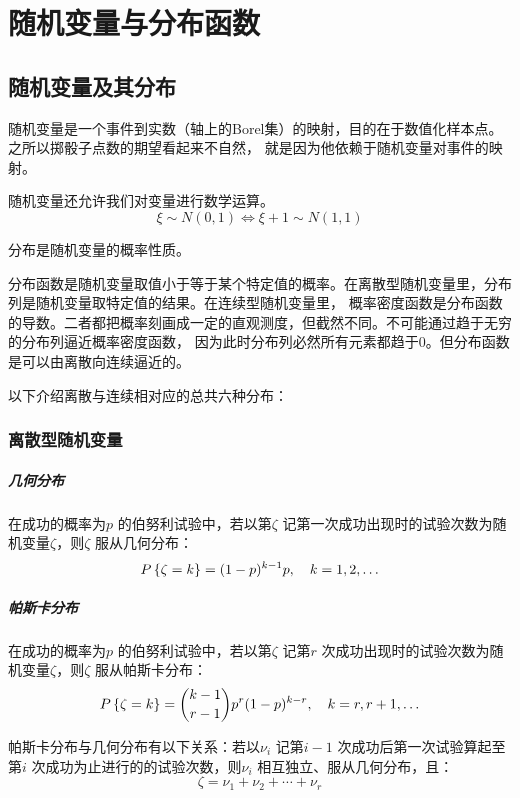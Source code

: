 \chapter{随机变量与分布函数}
\section{随机变量及其分布}
随机变量是一个事件到实数（轴上的Borel集）的映射，目的在于数值化样本点。之所以掷骰子点数的期望看起来不自然，
就是因为他依赖于随机变量对事件的映射。

随机变量还允许我们对变量进行数学运算。\[
    \xi \sim N(0,1) \iff \xi+1 \sim N(1,1)
\]

分布是随机变量的概率性质。

分布函数是随机变量取值小于等于某个特定值的概率。在离散型随机变量里，分布列是随机变量取特定值的结果。在连续型随机变量里，
概率密度函数是分布函数的导数。二者都把概率刻画成一定的直观测度，但截然不同。不可能通过趋于无穷的分布列逼近概率密度函数，
因为此时分布列必然所有元素都趋于0。但分布函数是可以由离散向连续逼近的。

以下介绍离散与连续相对应的总共六种分布：

\subsection{离散型随机变量}
\paragraph{几何分布} 在成功的概率为\(p\) 的伯努利试验中，若以第\(\zeta\)
记第一次成功出现时的试验次数为随机变量\(\zeta\)，则\(\zeta\) 服从几何分布：
\[
    \P{\zeta=k} = (1-p)^{k-1} p, \quad k=1,2,\ldots
\]

\paragraph{帕斯卡分布} 在成功的概率为\(p\) 的伯努利试验中，若以第\(\zeta\) 记第\(r\)
次成功出现时的试验次数为随机变量\(\zeta\)，则\(\zeta\) 服从帕斯卡分布：
\[
    \P{\zeta=k} = \binom{k-1}{r-1} p^r
    (1-p)^{k-r}, \quad k=r,r+1,\ldots
\]


帕斯卡分布与几何分布有以下关系：若以\(\nu_{i}\) 记第\(i-1\) 次成功后第一次试验算起至第\(i\)
次成功为止进行的的试验次数，则\(\nu_{i}\) 相互独立、服从几何分布，且：
\[
    \zeta = \nu_{1} + \nu_{2} + \cdots + \nu_{r}
\]

